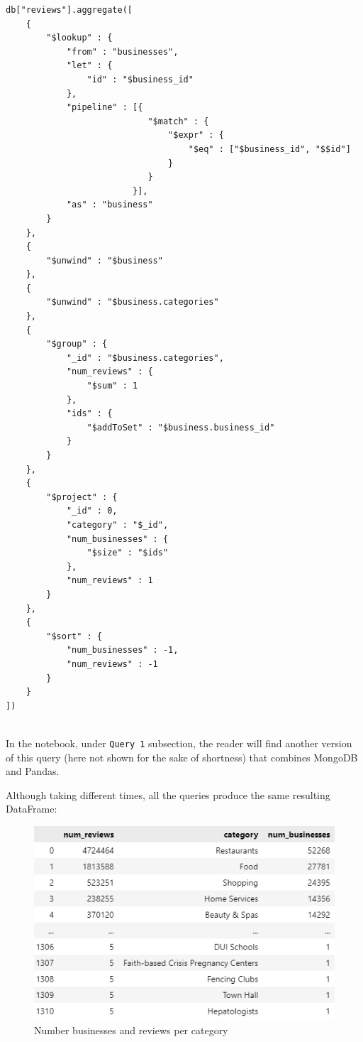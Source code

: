 \documentclass{Configuration_Files/PoliMi3i_thesis}
\begin{document}
\begin{lstlisting}[style=mongodb]
db["reviews"].aggregate([
    {
        "$lookup" : { 
            "from" : "businesses",
            "let" : { 
                "id" : "$business_id"
            },
            "pipeline" : [{
                            "$match" : { 
                                "$expr" : { 
                                    "$eq" : ["$business_id", "$$id"]
                                }                          
                            }   
                         }],
            "as" : "business" 
        }
    },
    {
        "$unwind" : "$business"
    },
    {
        "$unwind" : "$business.categories"
    },
    {
        "$group" : {
            "_id" : "$business.categories",
            "num_reviews" : {
                "$sum" : 1
            },
            "ids" : {
                "$addToSet" : "$business.business_id"
            }
        }
    },
    {
        "$project" : {
            "_id" : 0,
            "category" : "$_id",
            "num_businesses" : {
                "$size" : "$ids"
            },
            "num_reviews" : 1
        }
    },
    {
        "$sort" : {
            "num_businesses" : -1,
            "num_reviews" : -1
        }
    }
])
 
\end{lstlisting}

\bigskip

In the notebook, under \texttt{Query 1} subsection, the reader will find another version of this query (here not shown for the sake of shortness) that combines MongoDB and Pandas.

\bigskip

Although taking different times, all the queries produce the same resulting DataFrame:

\bigskip

\begin{figure}[H]
    \centering
    \includegraphics[width=2\columnwidth / 3]{imgs/businesses_and_reviews_per_category.png}
    \caption{Number businesses and reviews per category}
    \label{fig:num_businesses_and_reviews_per_category}
\end{figure}
\end{document}
